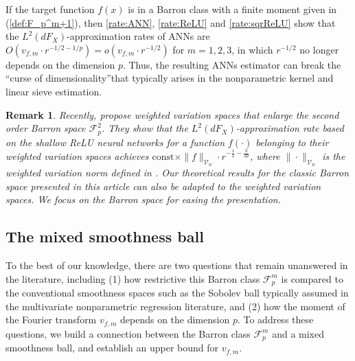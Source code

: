 \documentclass[11pt]{article}
\newtheorem{rk}{Remark}
\numberwithin{equation}{section}
\begin{document}
If the target function $f(x)$ is in a Barron class with a finite moment given in (\ref{def:F_p^m+1}), then \eqref{rate:ANN}, \eqref{rate:ReLU} and \eqref{rate:sqrReLU} show that the $L^{2}(dF_{X})$-approximation rates of ANNs are $O(v_{f,m}\cdot r^{-1/2-1/p})=o(v_{f,m}\cdot r^{-1/2})$ for $m=1,2,3$, in which $r^{-1/2}$ no longer depends on the dimension $p$. Thus, the resulting ANNs estimator
can break the \textquotedblleft curse of dimensionality\textquotedblright that typically arises in the nonparametric kernel and linear sieve estimation.

\begin{rk}
Recently, \cite{devore2023weighted} propose weighted variation spaces that enlarge the second order Barron space $\mathcal{F}_p^2$. They show that the $L^2(dF_X)$-approximation rate based on the shallow ReLU neural networks  for a function $f(\cdot)$ belonging to their weighted variation spaces achieves   $\text{const}\times\|f\|_{\mathcal{V}_w}\cdot r^{-\frac{1}{2}-\frac{3}{2p}}$, where $\|\cdot\|_{\mathcal{V}_w}$ is the weighted variation norm defined in \citet[Section 4, page 8]{devore2023weighted}. Our theoretical results for the classic Barron space presented in this article  can also be adapted to the weighted variation spaces. We focus on the Barron space  for easing the presentation.
\end{rk}



\subsection{The mixed smoothness ball}\label{sec:mixH}
To the best of our knowledge, there are two questions that remain unanswered in the literature, including (1) how restrictive this Barron
 class $\mathcal{F}_p^m$ is compared to the conventional smoothness spaces such as the Sobolev ball typically assumed in
the multivariate nonparametric regression literature, and (2) how the moment of the Fourier transform $v_{f,m}$ depends on the dimension $p$. To address
these questions, we build a connection between the Barron class $\mathcal{F}_p^m$ and a mixed smoothness ball, and establish an upper bound
for $v_{f,m}$.
\end{document}
